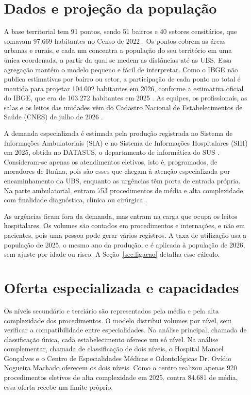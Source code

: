 \documentclass[12pt,a4paper,oneside]{report}
\begin{document}
\section{Dados e projeção da população}
A base territorial tem 91 pontos, sendo 51 bairros e 40 setores censitários, que somavam 97.669
habitantes no Censo de 2022 \citep{ibge2022}. Os pontos cobrem as áreas urbanas
e rurais, e cada um concentra a população do seu território em uma única coordenada, a partir da qual se
medem as distâncias até as UBS. Essa agregação mantém o modelo pequeno e fácil de interpretar. Como o IBGE não publica estimativas por bairro ou setor, a
participação de cada ponto no total é mantida para projetar 104.002 habitantes em 2026,
conforme a estimativa oficial do IBGE, que era de 103.272 habitantes em 2025 \citep{ibge2025est,ibge2026est}.
As equipes, os profissionais, as salas e os leitos das unidades vêm do Cadastro Nacional de
Estabelecimentos de Saúde (CNES) de julho de 2026 \citep{cnes2026}.

A demanda especializada é estimada pela produção registrada no Sistema de Informações Ambulatoriais (SIA)
e no Sistema de Informações Hospitalares (SIH) em 2025, obtida no DATASUS, o departamento de informática
do SUS \citep{datasus2026,tabnet}. Consideram-se apenas os atendimentos eletivos, isto é, programados, de
moradores de Itaúna, pois são esses que chegam à atenção especializada por encaminhamento da UBS, enquanto
as urgências têm porta de entrada própria. Na parte ambulatorial, entram 753 procedimentos de média e alta complexidade com
finalidade diagnóstica, clínica ou cirúrgica \citep{sigtap}.

As urgências ficam fora da demanda, mas
entram na carga que ocupa os leitos hospitalares. Os volumes são contados em procedimentos e internações, e
não em pacientes, pois uma pessoa pode gerar vários registros. A taxa de utilização usa a população de 2025, o mesmo ano da produção, e é aplicada à
população de 2026, sem ajuste por idade ou risco. A Seção~\ref{sec:ligacao} detalha esse cálculo.

\section{Oferta especializada e capacidades}
Os níveis secundário e terciário são representados pela média e pela alta complexidade dos
procedimentos. O modelo distribui volumes por nível, sem verificar a compatibilidade entre
especialidades. Na análise principal, chamada de classificação única, cada estabelecimento oferece um só
nível. Na análise complementar, chamada de classificação de dois níveis, o Hospital Manoel Gonçalves e o
Centro de Especialidades Médicas e Odontológicas Dr. Ovídio Nogueira Machado oferecem os dois níveis.
Como o centro realizou apenas 920 procedimentos eletivos de alta complexidade em 2025, contra 84.681 de
média, essa oferta recebe um limite próprio.
\end{document}
